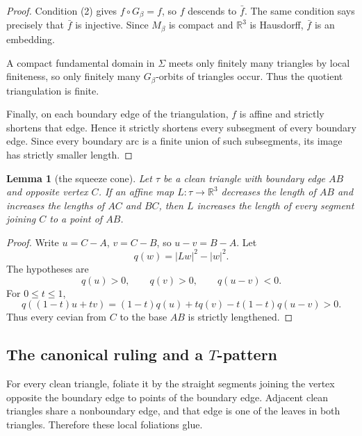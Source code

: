 \documentclass[12pt]{article}
\newtheorem{lemma}[theorem]{Lemma}
\newcommand{\R}{\mathbb R}
\begin{document}
\begin{proof}
Condition (2) gives \(f\circ G_\beta=f\), so \(f\) descends to \(\bar f\).  The same condition says precisely that \(\bar f\) is injective.  Since \(M_\beta\) is compact and \(\R^3\) is Hausdorff, \(\bar f\) is an embedding.

A compact fundamental domain in \(\Sigma\) meets only finitely many triangles by local finiteness, so only finitely many \(G_\beta\)-orbits of triangles occur.  Thus the quotient triangulation is finite.

Finally, on each boundary edge of the triangulation, \(f\) is affine and strictly shortens that edge.  Hence it strictly shortens every subsegment of every boundary edge.  Since every boundary arc is a finite union of such subsegments, its image has strictly smaller length.
\end{proof}

\begin{lemma}[the squeeze cone]
Let \(\tau\) be a clean triangle with boundary edge \(AB\) and opposite vertex \(C\).  If an affine map \(L:\tau\to \R^3\) decreases the length of \(AB\) and increases the lengths of \(AC\) and \(BC\), then \(L\) increases the length of every segment joining \(C\) to a point of \(AB\).
\end{lemma}

\begin{proof}
Write \(u=C-A\), \(v=C-B\), so \(u-v=B-A\).  Let
\[
q(w)=|Lw|^2-|w|^2 .
\]
The hypotheses are
\[
q(u)>0,\qquad q(v)>0,\qquad q(u-v)<0.
\]
For \(0\le t\le 1\),
\[
q((1-t)u+tv)
=(1-t)q(u)+tq(v)-t(1-t)q(u-v)>0.
\]
Thus every cevian from \(C\) to the base \(AB\) is strictly lengthened.
\end{proof}

\subsection{The canonical ruling and a \(T\)-pattern}

For every clean triangle, foliate it by the straight segments joining the vertex opposite the boundary edge to points of the boundary edge.  Adjacent clean triangles share a nonboundary edge, and that edge is one of the leaves in both triangles.  Therefore these local foliations glue.
\end{document}
